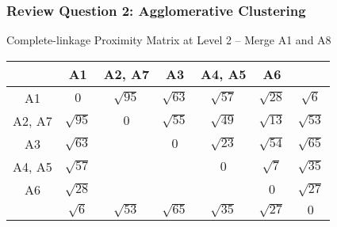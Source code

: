 \documentclass[aspectratio=169, 10pt]{beamer}
\begin{document}
\begin{frame}[t]
    \frametitle{Review Question 2: Agglomerative Clustering}
    \small

    Complete-linkage Proximity Matrix at Level 2 -- Merge A1 and A8

    \begin{table}[]
        \scriptsize
        \begin{tabular}{c|cccccc}
        \cellcolor[HTML]{FFFFFF}{\color[HTML]{000000} } & {\color[HTML]{000000} A1}  & {\color[HTML]{000000} A2, A7}      & {\color[HTML]{000000} A3}          & {\color[HTML]{000000} A4, A5}      & {\color[HTML]{000000} A6}          & \cellcolor[HTML]{9B9B9B}{\color[HTML]{000000} A8}          \\ \hline
        {\color[HTML]{000000} A1}                       & {\color[HTML]{000000} $0 $} & {\color[HTML]{3531FF} $\sqrt{95}$} & {\color[HTML]{9b9b9b} $\sqrt{63}$} & {\color[HTML]{3531FF} $\sqrt{57}$} & {\color[HTML]{3531FF} $\sqrt{28}$} & {\color[HTML]{9b9b9b} $\sqrt{6}$}  \\
        {\color[HTML]{000000} A2, A7}                   & {\color[HTML]{3531FF} $\sqrt{95}$} & {\color[HTML]{000000} $0$}         & {\color[HTML]{000000} $\sqrt{55}$} & {\color[HTML]{000000} $\sqrt{49}$} & {\color[HTML]{000000} $\sqrt{13}$} & {\color[HTML]{9b9b9b} $\sqrt{53}$} \\
        {\color[HTML]{000000} A3}                       & {\color[HTML]{9b9b9b} $\sqrt{63}$} & {\color[HTML]{000000} }            & {\color[HTML]{000000} $0$}         & {\color[HTML]{000000} $\sqrt{23}$} & {\color[HTML]{000000} $\sqrt{54}$} & {\color[HTML]{3531FF} $\sqrt{65}$} \\
        {\color[HTML]{000000} A4, A5}                   & {\color[HTML]{3531FF} $\sqrt{57}$} & {\color[HTML]{000000} }            & {\color[HTML]{000000} }            & {\color[HTML]{000000} $0$}         & {\color[HTML]{000000} $\sqrt{7}$}  & {\color[HTML]{9b9b9b} $\sqrt{35}$} \\
        {\color[HTML]{000000} A6}                       & {\color[HTML]{3531FF} $\sqrt{28}$} & {\color[HTML]{000000} }            & {\color[HTML]{000000} }            & {\color[HTML]{000000} }            & {\color[HTML]{000000} $0$}         & {\color[HTML]{9b9b9b} $\sqrt{27}$} \\
        \cellcolor[HTML]{9B9B9B}{\color[HTML]{000000} A8}                       & {\color[HTML]{9b9b9b} $\sqrt{6 }$} & {\color[HTML]{9b9b9b} $\sqrt{53}$}            & {\color[HTML]{3531FF} $\sqrt{65}$}            & {\color[HTML]{9b9b9b} $\sqrt{35}$}            & {\color[HTML]{9b9b9b} $\sqrt{27}$}            & {\color[HTML]{9b9b9b} $0$}        
        \end{tabular}
    \end{table}


\end{frame}
\end{document}
